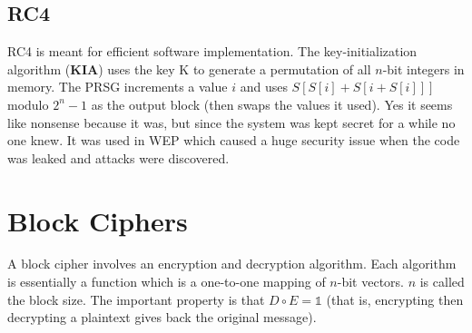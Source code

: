 \documentclass[11pt]{report}
\begin{document}
\subsection{RC4}
RC4 is meant for efficient software implementation. The key-initialization algorithm (\textbf{KIA}) uses the key K to generate a permutation of all $n$-bit integers in memory. The PRSG increments a value $i$ and uses $S[S[i] + S[i + S[i]]]$ modulo $2^n-1$ as the output block (then swaps the values it used). Yes it seems like nonsense because it was, but since the system was kept secret for a while no one knew. It was used in WEP which caused a huge security issue when the code was leaked and attacks were discovered.

\section{Block Ciphers}

A block cipher involves an encryption and decryption algorithm. Each algorithm is essentially a function which is a one-to-one mapping of $n$-bit vectors. $n$ is called the block size. The important property is that $D \circ E = \mathbb{1}$ (that is, encrypting then decrypting a plaintext gives back the original message).
\end{document}
